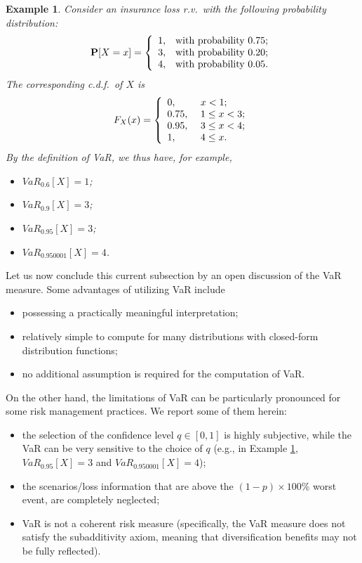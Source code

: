 \documentclass[12pt]{article}
\newtheorem{example}{\bf Example}
\begin{document}
\begin{example}
\label{exm:discrete}
Consider an insurance loss r.v.\ with the following probability distribution:
\[
\mathbf{P}[X=x]=\left\{
                  \begin{array}{ll}
                    1, & \hbox{with probability $0.75$;} \\
                    3, & \hbox{with probability $0.20$;} \\
                    4, & \hbox{with probability $0.05$.}
                  \end{array}
                \right.
\]
The corresponding c.d.f.\ of $X$ is
\[
F_X(x)=\left\{
         \begin{array}{ll}
           0, & \hbox{ $x<1$;} \\
           0.75, & \hbox{ $1\leq x<3$;} \\
           0.95, & \hbox{ $3\leq x<4$;} \\
           1, & \hbox{ $4\leq x$.}
         \end{array}
       \right.
\]
By the definition of VaR, we thus have, for example,
\begin{itemize}
\item $VaR_{0.6}[X]=1$;
\item $VaR_{0.9}[X]=3$;
\item $VaR_{0.95}[X]=3$;
\item $VaR_{0.950001}[X]=4$.
\end{itemize}
\end{example}
Let us now conclude this current subsection by an open discussion of the VaR measure.  Some advantages of utilizing VaR include
\begin{itemize}
\item possessing a practically meaningful interpretation;
\item relatively simple to compute for many distributions with closed-form distribution functions;
\item no additional assumption is required for the computation of VaR.
\end{itemize}
On the other hand, the limitations of VaR can be particularly pronounced for some risk management practices.  We report some of them herein:
\begin{itemize}
  \item the selection of the confidence level $q\in [0,1]$ is highly subjective, while the VaR can be very sensitive to the choice of $q$ (e.g., in Example \ref{exm:discrete}, $VaR_{0.95}[X]=3$ and $VaR_{0.950001}[X]=4$);
\item the scenarios/loss information that are above the $(1-p)\times 100\%$ worst event, are completely neglected;
\item VaR is not a coherent risk measure (specifically, the VaR measure does not satisfy the subadditivity axiom, meaning that diversification benefits may not be fully reflected).
\end{itemize}
\end{document}
